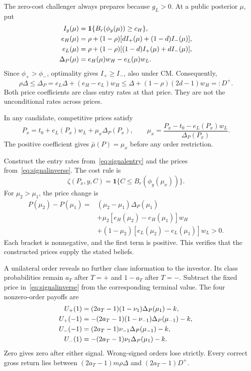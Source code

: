 \documentclass[12pt]{article}
\newcommand{\ind}{\mathbf 1}
\newcommand{\D}{\Delta}
\begin{document}
The zero-cost challenger always prepares because $g_L>0$.
At a public posterior $\mu$, put
\begin{align}\label{eq:signalentry}
 I_y(\mu)&=\ind\{B_r(\phi_y(\mu))\ge c_H\},\\
 e_H(\mu)&=\rho+(1-\rho)[dI_+(\mu)+(1-d)I_-(\mu)],\notag\\
 e_L(\mu)&=\rho+(1-\rho)[(1-d)I_+(\mu)+dI_-(\mu)],\notag\\
 \Delta_P(\mu)&=e_H(\mu)w_H-e_L(\mu)w_L.\notag
\end{align}
Since $\phi_+>\phi_-$, optimality gives $I_+\ge I_-$, also under CM.
Consequently,
\begin{equation}\label{eq:signalbounds}
 \rho\D\le\Delta_P
 =e_L\D+(e_H-e_L)w_H
 \le\D+(1-\rho)(2d-1)w_H=:D^+.
\end{equation}
Both price coefficients are class entry rates at that price.
They are not the unconditional rates across prices.

In any candidate, competitive prices satisfy
\begin{equation}\label{eq:signalinverse}
 P_x=t_0+e_L(P_x)w_L+\mu_x\Delta_P(P_x),\qquad
 \mu_x=\frac{P_x-t_0-e_L(P_x)w_L}{\Delta_P(P_x)}.
\end{equation}
The positive coefficient gives $\bar\mu(P)=\mu_x$ before any order restriction.

Construct the entry rates from~\eqref{eq:signalentry} and the prices from~\eqref{eq:signalinverse}.
The cost rule is
\[
 \zeta(P_x,y,C)=\ind\{C\le B_r(\phi_y(\mu_x))\}.
\]
For $\mu_2>\mu_1$, the price change is
\begin{align*}
 P(\mu_2)-P(\mu_1)={}&(\mu_2-\mu_1)\Delta_P(\mu_1)\\
 &+\mu_2[e_H(\mu_2)-e_H(\mu_1)]w_H\\
 &+(1-\mu_2)[e_L(\mu_2)-e_L(\mu_1)]w_L>0.
\end{align*}
Each bracket is nonnegative, and the first term is positive.
This verifies that the constructed prices supply the stated beliefs.

A unilateral order reveals no further class information to the investor.
Its class probabilities remain $a_T$ after $T=+$ and $1-a_T$ after $T=-$.
Subtract the fixed price in~\eqref{eq:signalinverse} from the corresponding terminal value.
The four nonzero-order payoffs are
\begin{align}\label{eq:signalpayoffs}
 U_+(1)&=(2a_T-1)(1-\nu_1)\Delta_P(\mu_1)-k,\\
 U_+(-1)&=-(2a_T-1)(1-\nu_{-1})\Delta_P(\mu_{-1})-k,\notag\\
 U_-(-1)&=(2a_T-1)\nu_{-1}\Delta_P(\mu_{-1})-k,\notag\\
 U_-(1)&=-(2a_T-1)\nu_1\Delta_P(\mu_1)-k.\notag
\end{align}
Zero gives zero after either signal.
Wrong-signed orders lose strictly.
Every correct gross return lies between $(2a_T-1)m\rho\D$ and $(2a_T-1)D^+$.
\end{document}
